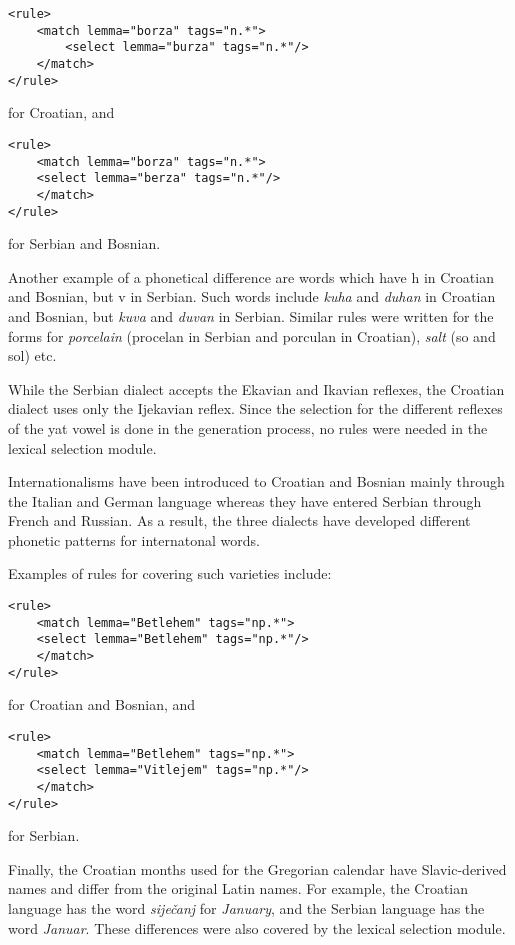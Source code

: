 {\small
\begin{Verbatim}
<rule>
    <match lemma="borza" tags="n.*">
        <select lemma="burza" tags="n.*"/>
    </match>
</rule>
\end{Verbatim}
}
for Croatian, and 
{\small
\begin{Verbatim}
<rule>
    <match lemma="borza" tags="n.*">
	<select lemma="berza" tags="n.*"/>
    </match>
</rule>

\end{Verbatim}

for Serbian and Bosnian.

Another example of a phonetical difference are words which have h in Croatian and Bosnian, but v in Serbian.
Such words include \emph{kuha} and \emph{duhan} in Croatian and Bosnian, but \emph{kuva} and \emph{duvan} in Serbian.
Similar rules were written for the forms for \emph{porcelain} (procelan in Serbian and porculan in Croatian), 
\emph{salt} (so and sol) etc.

While the Serbian dialect accepts the Ekavian and Ikavian reflexes, 
the Croatian dialect uses only the Ijekavian reflex.
Since the selection for the different reflexes of the yat vowel is done in the generation process,
no rules were needed in the lexical selection module.

Internationalisms have been introduced to Croatian and Bosnian mainly through the Italian and German language
whereas they have entered Serbian through French and Russian. 
As a result, the three dialects have developed different phonetic patterns for internatonal words.

Examples of rules for covering such varieties include:
{\small
\begin{Verbatim}
<rule>
    <match lemma="Betlehem" tags="np.*">
	<select lemma="Betlehem" tags="np.*"/>
    </match>
</rule>
\end{Verbatim}
}
for Croatian and Bosnian, and
{\small
\begin{Verbatim}
<rule>
    <match lemma="Betlehem" tags="np.*">
	<select lemma="Vitlejem" tags="np.*"/>
    </match>
</rule>
\end{Verbatim}
}
for Serbian.

Finally, the Croatian months used for the Gregorian calendar have Slavic-derived names and differ from the original Latin names.
For example, the Croatian language has the word \emph{siječanj} for \emph{January}, and 
the Serbian language has the word \emph{Januar}.
These differences were also covered by the lexical selection module.

}
